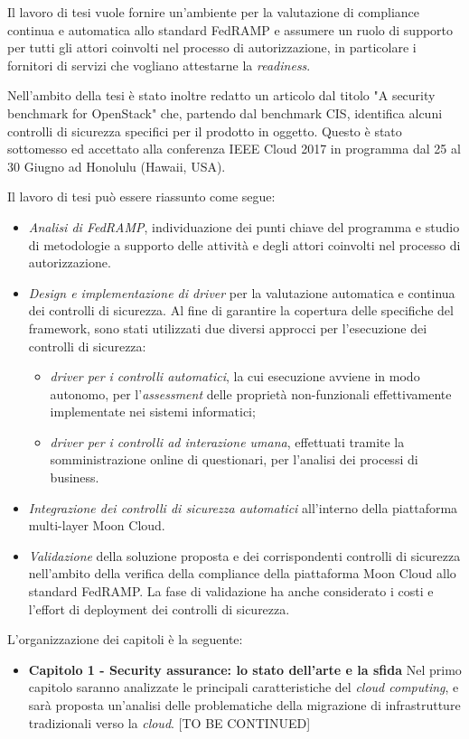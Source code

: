 \documentclass[../main.tex]{subfiles}
\begin{document}
Il lavoro di tesi vuole fornire un'ambiente per la valutazione di compliance continua e automatica allo standard FedRAMP e assumere un ruolo di supporto per tutti gli attori coinvolti nel processo di autorizzazione, in particolare i fornitori di servizi che vogliano attestarne la \textit{readiness}.


Nell'ambito della tesi è stato inoltre redatto un articolo dal titolo "A security benchmark for OpenStack" che, partendo dal benchmark CIS, identifica alcuni controlli di sicurezza specifici per il prodotto in oggetto.
Questo è stato sottomesso ed accettato alla conferenza IEEE Cloud 2017 in programma dal 25 al 30 Giugno  ad Honolulu (Hawaii, USA).


Il lavoro di tesi può essere riassunto come segue:
\begin{itemize}
\item \textit{Analisi di FedRAMP}, individuazione dei punti chiave del programma e studio di metodologie a supporto delle attività e degli attori coinvolti nel processo di autorizzazione.
\item \textit{Design e implementazione di driver} per la valutazione automatica e continua dei controlli di sicurezza.
Al fine di garantire la copertura delle specifiche del framework, sono stati utilizzati due diversi approcci per l'esecuzione dei controlli di sicurezza:
\begin{itemize}
\item \textit{driver per i controlli automatici}, la cui esecuzione avviene in modo autonomo, per l'\textit{assessment} delle proprietà non-funzionali effettivamente implementate nei sistemi informatici;
\item \textit{driver per i controlli ad interazione umana}, effettuati tramite la somministrazione online di questionari, per l'analisi dei processi di business.
\end{itemize}
\item \textit{Integrazione dei controlli di sicurezza automatici} all'interno della piattaforma multi-layer Moon Cloud.
\item \textit{Validazione} della soluzione proposta e dei corrispondenti controlli di sicurezza nell'ambito della verifica della compliance della piattaforma Moon Cloud allo standard FedRAMP. La fase di validazione ha anche considerato i costi e l'effort di deployment dei controlli di sicurezza.
\end{itemize}

L'organizzazione dei capitoli è la seguente:
\begin{itemize}
    \item \textbf{Capitolo 1 - Security assurance: lo stato dell'arte e la sfida}
        Nel primo capitolo saranno analizzate le principali caratteristiche del \textit{cloud computing}, e sarà proposta un'analisi delle problematiche della migrazione di infrastrutture tradizionali verso la \textit{cloud}.
        [TO BE CONTINUED]
\end{itemize}


\end{document}
